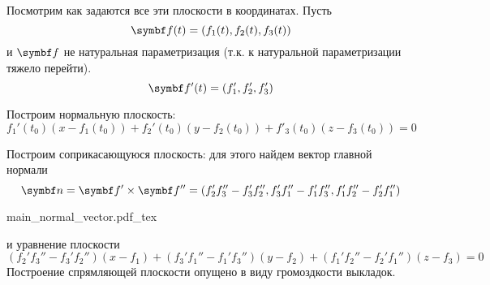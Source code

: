 \documentclass[main]{subfiles}
\begin{document}
Посмотрим как задаются все эти плоскости в координатах.
Пусть
\[\vf(t) = (f_1(t), f_2(t), f_3(t))\]
и $\vf$ не натуральная параметризация (т.к. к натуральной параметризации тяжело перейти).
\[\vf'(t) = (f_1',f_2',f_3')\]

Построим нормальную плоскость:
\[f_1'(t_0)(x - f_1(t_0)) + f_2'(t_0)(y - f_2(t_0)) + f'_3(t_0)(z - f_3(t_0)) = 0\]

Построим соприкасающуюся плоскость:
для этого найдем вектор главной нормали
\[\vn = \vf' \times \vf'' = (f_2'f_3'' - f_3'f_2'',f_3'f_1'' - f_1'f_3'', f_1'f_2'' - f_2'f_1'')\]
\begin{center}
    {main_normal_vector.pdf_tex}
\end{center}
и уравнение плоскости
\[(f_2'f_3'' - f_3'f_2'')(x - f_1) + (f_3'f_1'' - f_1'f_3'')(y - f_2) + (f_1'f_2'' - f_2'f_1'')(z - f_3) = 0\]
Построение спрямляющей плоскости опущено в виду громоздкости выкладок.
\end{document}
